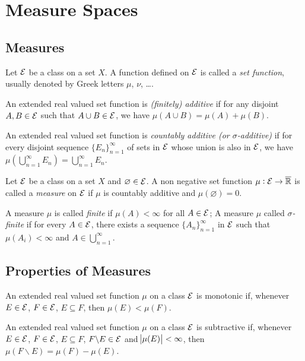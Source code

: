 \chapter{Measure Spaces}

\section{Measures}
Let $\mathcal{E}$ be a class on a set $X$. 
A function defined on $\mathcal{E}$ is called a \emph{set function}, usually 
denoted by Greek letters $\mu$, $\nu$, \dots. 

An extended real valued set function is \emph{(finitely) additive} 
if for any disjoint $A, B \in \mathcal{E}$ such that $A \cup B \in \mathcal{E}$, we have 
$\mu(A \cup B) = \mu(A) + \mu(B)$. 

An extended real valued set function is \emph{countably additive (or 
$\sigma$-additive)} if for every disjoint sequence $\{E_n\}_{n=1}^\infty$ 
of sets in $\mathcal{E}$ whose union is also in $\mathcal{E}$, we have 
$\mu\left( \bigcup_{n=1}^\infty E_n \right) = \bigcup_{n=1}^\infty E_n$. 

\begin{defn}
Let $\mathcal{E}$ be a class on a set $X$ and $\varnothing \in \mathcal{E}$. 
A non negative set function $\mu: \mathcal{E} \to \overline{\mathbb{R}}$ is called a 
\emph{measure} on $\mathcal{E}$ if $\mu$ is countably additive and 
$\mu(\varnothing) = 0$. 

A measure $\mu$ is called \emph{finite} if $\mu(A) < \infty$ for all 
$A \in \mathcal{E}$; 
A measure $\mu$ called \emph{$\sigma$-finite} if for every $A \in \mathcal{E}$, 
there exists a sequence $\{A_n\}_{n=1}^\infty$ in $\mathcal{E}$ such that 
$\mu(A_i) < \infty$ and $A \in \bigcup_{n=1}^\infty$. 
\end{defn}

\section{Properties of Measures}
An extended real valued set function $\mu$ on a class $\mathcal{E}$ is monotonic if, 
whenever $E \in \mathcal{E}$, $F \in \mathcal{E}$, $E \subseteq F$, then $\mu(E) < \mu(F)$. 

An extended real valued set function $\mu$ on a class $\mathcal{E}$ is subtractive 
if, whenever $E \in \mathcal{E}$, $F \in \mathcal{E}$, $E \subseteq F$, $F \backslash E 
\in \mathcal{E}$ and $\abs{\mu(E)} < \infty$, then $\mu(F \backslash E) = \mu(F) - \mu(E)$. 

